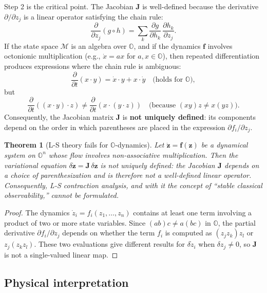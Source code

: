 \documentclass[11pt]{article}
\newtheorem{theorem}{Theorem}[section]
\begin{document}
Step 2 is the critical point. The Jacobian $\mathbf{J}$ is well-defined
because the derivative $\partial/\partial z_j$ is a linear operator
satisfying the chain rule:
\[
\frac{\partial}{\partial z_j}(g \circ h) = \sum_k 
\frac{\partial g}{\partial h_k}\,\frac{\partial h_k}{\partial z_j}.
\]
If the state space $\mathcal{M}$ is an algebra over $\mathbb{O}$, and if
the dynamics $\mathbf{f}$ involves octonionic multiplication (e.g.,
$\dot{x} = ax$ for $a, x \in \mathbb{O}$), then repeated differentiation
produces expressions where the chain rule is ambiguous:
\[
\frac{\partial}{\partial t}(x \cdot y) = \dot{x} \cdot y + x \cdot \dot{y}
\quad\text{(holds for $\mathbb{O}$)},
\]
but
\[
\frac{\partial}{\partial t}((x \cdot y) \cdot z) \neq
\frac{\partial}{\partial t}(x \cdot (y \cdot z))
\quad\text{(because $(xy)z \neq x(yz)$)}.
\]
Consequently, the Jacobian matrix $\mathbf{J}$ is \textbf{not uniquely
defined}: its components depend on the order in which parentheses are
placed in the expression $\partial f_i / \partial z_j$.

\begin{theorem}[L-S theory fails for $\mathbb{O}$-dynamics]
\label{thm:o-failure}
Let $\dot{\mathbf{z}} = \mathbf{f}(\mathbf{z})$ be a dynamical system on
$\mathbb{O}^n$ whose flow involves non-associative multiplication.
Then the variational equation $\delta\dot{\mathbf{z}} = \mathbf{J}\,\delta\mathbf{z}$
is not uniquely defined: the Jacobian $\mathbf{J}$ depends on a choice
of parenthesization and is therefore not a well-defined linear operator.
Consequently, L-S contraction analysis, and with it the concept of
``stable classical observability,'' cannot be formulated.
\end{theorem}

\begin{proof}
The dynamics $\dot{z}_i = f_i(z_1, \dots, z_n)$ contains at least one
term involving a product of two or more state variables. Since
$(ab)c \neq a(bc)$ in $\mathbb{O}$, the partial derivative
$\partial f_i / \partial z_j$ depends on whether the term $f_i$ is
computed as $(z_j z_k)z_l$ or $z_j(z_k z_l)$. These two evaluations
give different results for $\delta\dot{z}_i$ when $\delta z_j \neq 0$,
so $\mathbf{J}$ is not a single-valued linear map.
\end{proof}

\subsection{Physical interpretation}
\label{sec:physical}
\end{document}
